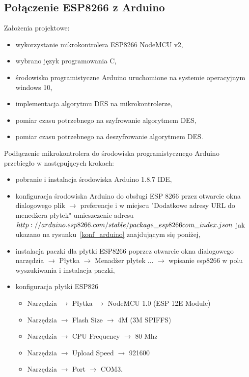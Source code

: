 \documentclass[12p]{article}
\begin{document}
\subsection{Połączenie ESP8266 z Arduino}
Założenia projektowe:
\begin{itemize}
\item wykorzystanie mikrokontrolera ESP8266 NodeMCU v2,
\item wybrano język programowania C,
\item środowisko programistyczne Arduino uruchomione na systemie operacyjnym windows 10,
\item implementacja algorytmu DES na mikrokontrolerze,
\item pomiar czasu potrzebnego na szyfrowanie algorytmem DES,
\item pomiar czasu potrzebnego na deszyfrowanie algorytmem DES.
\end{itemize}


Podłączenie mikrokontrolera do środowiska programistycznego Arduino przebiegło w następujących krokach:
\begin{itemize}
\item pobranie i instalacja środowiska Arduino 1.8.7 IDE,
\item konfiguracja środowiska Arduino do obsługi ESP 8266 przez otwarcie okna dialogowego plik $\rightarrow$ preferencje i w miejscu "Dodatkowe adresy URL do menedżera płytek" umieszczenie adresu $http://arduino.esp8266.com/stable/package\char`_esp8266com\char`_index.json$ jak ukazano na rysunku~\ref{konf_arduino} znajdującym się poniżej,
\item instalacja paczki dla płytki ESP8266 poprzez otwarcie okna dialogowego narzędzia $\rightarrow$ Płytka $\rightarrow$ Menadżer płytek ... $\rightarrow$ wpisanie esp8266 w polu wyszukiwania i instalacja paczki,
\item konfiguracja płytki ESP826
\begin{itemize}
\item Narzędzia $\rightarrow$ Płytka $\rightarrow$ NodeMCU 1.0 (ESP-12E Module)
\item Narzędzia $\rightarrow$ Flash Size $\rightarrow$ 4M (3M SPIFFS)
\item Narzędzia $\rightarrow$ CPU Frequency $\rightarrow$ 80 Mhz
\item Narzędzia $\rightarrow$ Upload Speed $\rightarrow$ 921600
\item Narzędzia $\rightarrow$ Port $\rightarrow$ COM3.
\end{itemize} 
\end{itemize}
\end{document}
